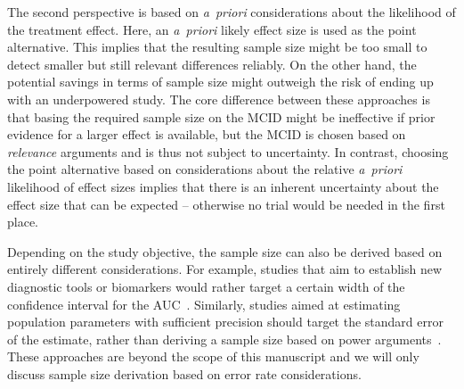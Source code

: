 \documentclass{article}
\begin{document}
The second perspective is based on \textit{a~priori} considerations about the likelihood of the treatment effect.
Here, an \textit{a~priori} likely effect size is used as the point alternative.
This implies that the resulting sample size might be too small to detect smaller but still relevant differences reliably.
On the other hand, the potential savings in terms of sample size might outweigh the risk of ending up with an underpowered study.
The core difference between these approaches is that basing the required sample size on the MCID might be ineffective if prior evidence for a larger effect is available, but the MCID is chosen based on \emph{relevance} arguments and is thus not subject to uncertainty.
In contrast, choosing the point alternative based on considerations about the relative \textit{a~priori} likelihood of effect sizes implies that there is an inherent uncertainty about the effect size that can be expected -- otherwise no trial would be needed in the first place.



Depending on the study objective, the sample size can also be
derived based on entirely different considerations.
For example, studies that aim to establish new diagnostic tools or biomarkers would rather target a certain width of the confidence interval for the AUC~\citep{obuchowski1998}.
Similarly, studies aimed at estimating population parameters with sufficient precision should target the standard error of the estimate, rather than deriving a sample size based on power arguments~\citep{Thompson2012,grouin-2007}.
These approaches are beyond the scope of this manuscript and we will only discuss sample size derivation based on error rate considerations.
\end{document}
